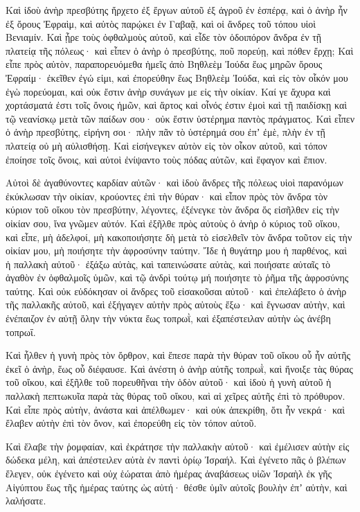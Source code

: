 {\par }{\PP {}Καὶ ἰδοὺ ἀνὴρ πρεσβύτης ἤρχετο ἐξ ἔργων αὐτοῦ ἐξ ἀγροῦ ἐν ἑσπέρᾳ, καὶ ὁ ἀνὴρ ἦν ἐξ ὄρους Ἐφραὶμ, καὶ αὐτὸς παρῴκει ἐν Γαβαᾷ, καὶ οἱ ἄνδρες τοῦ τόπου υἱοὶ Βενιαμίν.
Καὶ ᾖρε τοὺς ὀφθαλμοὺς αὐτοῦ, καὶ εἶδε τὸν ὁδοιπόρον ἄνδρα ἐν τῇ πλατείᾳ τῆς πόλεως· καὶ εἶπεν ὁ ἀνὴρ ὁ πρεσβύτης, ποῦ πορεύῃ, καὶ πόθεν ἔρχῃ;
Καὶ εἶπε πρὸς αὐτὸν, παραπορευόμεθα ἡμεῖς ἀπὸ Βηθλεὲμ Ἰούδα ἕως μηρῶν ὄρους Ἐφραίμ· ἐκεῖθεν ἐγώ εἰμι, καὶ ἐπορεύθην ἕως Βηθλεὲμ Ἰούδα, καὶ εἰς τὸν οἶκόν μου ἐγὼ πορεύομαι, καὶ οὐκ ἔστιν ἀνὴρ συνάγων με εἰς τὴν οἰκίαν.
Καί γε ἄχυρα καὶ χορτάσματά ἐστι τοῖς ὄνοις ἡμῶν, καὶ ἄρτος καὶ οἶνός ἐστιν ἐμοὶ καὶ τῇ παιδίσκῃ καὶ τῷ νεανίσκῳ μετὰ τῶν παίδων σου· οὐκ ἔστιν ὑστέρημα παντὸς πράγματος.
Καὶ εἶπεν ὁ ἀνὴρ πρεσβύτης, εἰρήνη σοι· πλὴν πᾶν τὸ ὑστέρημά σου ἐπʼ ἐμὲ, πλὴν ἐν τῇ πλατείᾳ οὐ μὴ αὐλισθήσῃ.
Καὶ εἰσήνεγκεν αὐτὸν εἰς τὸν οἶκον αὐτοῦ, καὶ τόπον ἐποίησε τοῖς ὄνοις, καὶ αὐτοὶ ἐνίψαντο τοὺς πόδας αὐτῶν, καὶ ἔφαγον καὶ ἔπιον.
\par }{\PP {}Αὐτοὶ δὲ ἀγαθύνοντες καρδίαν αὐτῶν· καὶ ἰδοὺ ἄνδρες τῆς πόλεως υἱοὶ παρανόμων ἐκύκλωσαν τὴν οἰκίαν, κρούοντες ἐπὶ τὴν θύραν· καὶ εἶπον πρὸς τὸν ἄνδρα τὸν κύριον τοῦ οἴκου τὸν πρεσβύτην, λέγοντες, ἐξένεγκε τὸν ἄνδρα ὅς εἰσῆλθεν εἰς τὴν οἰκίαν σου, ἵνα γνῶμεν αὐτόν.
Καὶ ἐξῆλθε πρὸς αὐτοὺς ὁ ἀνὴρ ὁ κύριος τοῦ οἴκου, καὶ εἶπε, μὴ ἀδελφοί, μὴ κακοποιήσητε δὴ μετὰ τὸ εἰσελθεῖν τὸν ἄνδρα τοῦτον εἰς τὴν οἰκίαν μου, μὴ ποιήσητε τὴν ἀφροσύνην ταύτην.
Ἴδε ἡ θυγάτηρ μου ἡ παρθένος, καὶ ἡ παλλακὴ αὐτοῦ· ἐξάξω αὐτὰς, καὶ ταπεινώσατε αὐτὰς, καὶ ποιήσατε αὐταῖς τὸ ἀγαθὸν ἐν ὀφθαλμοῖς ὑμῶν, καὶ τῷ ἀνδρὶ τούτῳ μή ποιήσητε τὸ ῥῆμα τῆς ἀφροσύνης ταύτης.
Καὶ οὐκ εὐδόκησαν οἱ ἄνδρες τοῦ εἰσακοῦσαι αὐτοῦ· καὶ ἐπελάβετο ὁ ἀνὴρ τῆς παλλακῆς αὐτοῦ, καὶ ἐξήγαγεν αὐτὴν πρὸς αὐτοὺς ἔξω· καὶ ἔγνωσαν αὐτὴν, καὶ ἐνέπαιζον ἐν αὐτῇ ὅλην τὴν νύκτα ἕως τοπρωῒ, καὶ ἐξαπέστειλαν αὐτὴν ὡς ἀνέβη τοπρωΐ.
\par }{\PP {}Καὶ ἦλθεν ἡ γυνὴ πρὸς τὸν ὄρθρον, καὶ ἔπεσε παρὰ τὴν θύραν τοῦ οἴκου οὗ ἦν αὐτῆς ἐκεῖ ὁ ἀνὴρ, ἕως οὗ διέφαυσε.
Καὶ ἀνέστη ὁ ἀνὴρ αὐτῆς τοπρωῒ, καὶ ἤνοιξε τὰς θύρας τοῦ οἴκου, καὶ ἐξῆλθε τοῦ πορευθῆναι τὴν ὁδὸν αὐτοῦ· καὶ ἰδοὺ ἡ γυνὴ αὐτοῦ ἡ παλλακὴ πεπτωκυῖα παρὰ τὰς θύρας τοῦ οἴκου, καὶ αἱ χεῖρες αὐτῆς ἐπὶ τὸ πρόθυρον.
Καὶ εἶπε πρὸς αὐτὴν, ἀνάστα καὶ ἀπέλθωμεν· καὶ οὐκ ἀπεκρίθη, ὅτι ἦν νεκρά· καὶ ἔλαβεν αὐτὴν ἐπὶ τὸν ὄνον, καὶ ἐπορεύθη εἰς τὸν τόπον αὐτοῦ.
\par }{\PP {}Καὶ ἔλαβε τὴν ῥομφαίαν, καὶ ἐκράτησε τὴν παλλακὴν αὐτοῦ· καὶ ἐμέλισεν αὐτὴν εἰς δώδεκα μέλη, καὶ ἀπέστειλεν αὐτὰ ἐν παντὶ ὁρίῳ Ἰσραήλ.
Καὶ ἐγένετο πᾶς ὁ βλέπων ἔλεγεν, οὐκ ἐγένετο καὶ οὐχ ἑώραται ἀπὸ ἡμέρας ἀναβάσεως υἱῶν Ἰσραὴλ ἐκ γῆς Αἰγύπτου ἕως τῆς ἡμέρας ταύτης ὠς αὐτή· θέσθε ὑμῖν αὐτοῖς βουλὴν ἐπʼ αὐτὴν, καὶ λαλήσατε.

}
